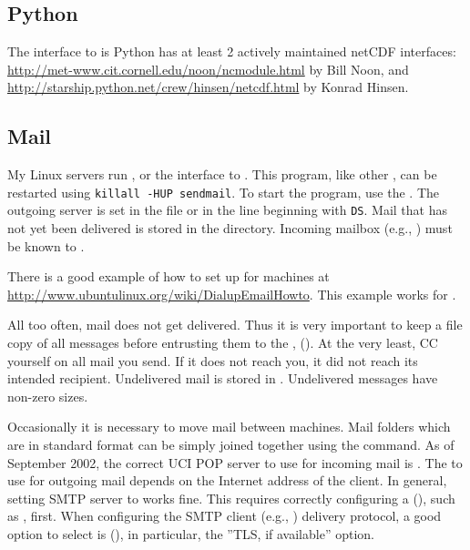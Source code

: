 \documentclass[12pt,twoside]{article}
\begin{document}
\subsection{Python}\label{sxn:python}
The  interface to  is 
Python has at least 2 actively maintained netCDF interfaces:
\url{http://met-www.cit.cornell.edu/noon/ncmodule.html} by Bill Noon, and
\url{http://starship.python.net/crew/hinsen/netcdf.html} by Konrad Hinsen.

\subsection{Mail}\label{sxn:mail}
My Linux servers run , or the 
interface to .
This program, like other , can be restarted using
\verb'killall -HUP sendmail'.
To start the program, use the  .
The outgoing  server is set in the file
 or  in the line
beginning with \verb'DS'.
Mail that has not yet been delivered is stored in the
 directory.
Incoming mailbox (e.g., ) must be known 
to . 

There is a good example of how to set up  for
 machines at
\url{http://www.ubuntulinux.org/wiki/DialupEmailHowto}.
This example works for .

All too often, mail does not get delivered.
Thus it is very important to keep a file copy of all messages before
entrusting them to the , ().
At the very least, CC yourself on all mail you send.
If it does not reach you, it did not reach its intended recipient.
Undelivered mail is stored in .
Undelivered messages have non-zero sizes.

Occasionally it is necessary to move mail between machines.
Mail folders which are in standard format can be simply joined
together using the  command.
As of September 2002, the correct UCI POP server to use for incoming
mail is .
The  to use for outgoing mail depends on the
Internet address of the client.
In general, setting SMTP server to 
 works fine.
This requires correctly configuring a 
(), such as , first. 
When configuring the SMTP client (e.g., ) delivery
protocol, a good option to select is (), in particular,
the ''TLS, if available'' option.
\end{document}
